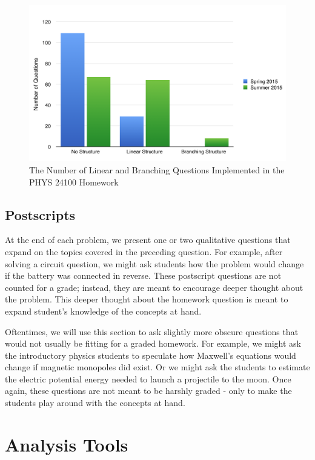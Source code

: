 \begin{figure}[!htb]
	\centering
	\includegraphics[width=6in]{img/chapter4/question_statistics}
	\caption[The Number of Linear and Branching Questions Implemented in the PHYS 24100 Homework]{The Number of Linear and Branching Questions Implemented in the PHYS 24100 Homework}
  \label{fig:questionStatistics}
\end{figure}


\subsection{Postscripts}

At the end of each problem, we present one or two qualitative questions that expand on the topics covered in the preceding question. For example, after solving a circuit question, we might ask students how the problem would change if the battery was connected in reverse. These postscript questions are not counted for a grade; instead, they are meant to encourage deeper thought about the problem. This deeper thought about the homework question is meant to expand student’s knowledge of the concepts at hand.

Oftentimes, we will use this section to ask slightly more obscure questions that would not usually be fitting for a graded homework. For example, we might ask the introductory physics students to speculate how Maxwell's equations would change if magnetic monopoles did exist. Or we might ask the students to estimate the electric potential energy needed to launch a projectile to the moon. Once again, these questions are not meant to be harshly graded - only to make the students play around with the concepts at hand.

\section{Analysis Tools}

